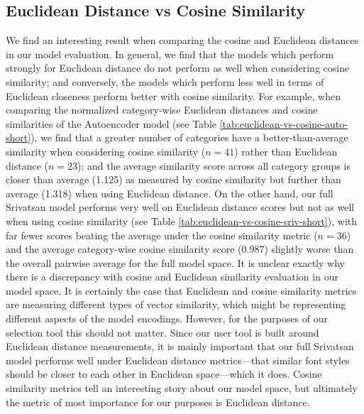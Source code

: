 \subsection{Euclidean Distance vs Cosine Similarity}

We find an interesting result when comparing the cosine and Euclidean distances in our model evaluation. In general, we find that the models which perform strongly for Euclidean distance do not perform as well when considering cosine similarity; and conversely, the models which perform less well in terms of Euclidean closeness perform better with cosine similarity. For example, when comparing the normalized category-wise Euclidean distances and cosine similarities of the Autoencoder model (see Table \ref{tab:euclidean-vs-cosine-auto-short}), we find that a greater number of categories have a better-than-average similarity when considering cosine similarity ($n=41$) rather than Euclidean distance ($n=23$); and the average similarity score across all category groups is closer than average (1.125) as measured by cosine similarity but further than average (1.318) when using Euclidean distance. On the other hand, our full Srivatsan model performs very well on Euclidean distance scores but not as well when using cosine similarity (see Table \ref{tab:euclidean-vs-cosine-sriv-short}), with far fewer scores beating the average under the cosine similarity metric ($n=36$) and the average category-wise cosine similarity score (0.987) slightly worse than the overall pairwise average for the full model space. It is unclear exactly why there is a discrepancy with cosine and Euclidean similarity evaluation in our model space. It is certainly the case that Euclidean and cosine similarity metrics are measuring different types of vector similarity, which might be representing different aspects of the model encodings. However, for the purposes of our selection tool this should not matter. Since our user tool is built around Euclidean distance measurements, it is mainly important that our full Srivatsan model performs well under Euclidean distance metrics---that similar font styles should be closer to each other in Euclidean space---which it does. Cosine similarity metrics tell an interesting story about our model space, but ultimately the metric of most importance for our purposes is Euclidean distance.

